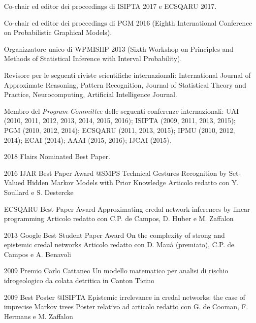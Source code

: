 \begin{cvitems}
\item Co-chair ed editor dei proceedings di ISIPTA 2017 e ECSQARU 2017.
\item Co-chair ed editor dei proceedings di PGM 2016 (Eighth International Conference on Probabilistic Graphical Models).
\item Organizzatore unico di WPMISIIP 2013 (Sixth Workshop on Principles and Methods of Statistical Inference with Interval Probability).
\item Revisore per le seguenti riviste scientifiche internazionali: International Journal of Approximate Reasoning, Pattern Recognition, Journal of Statistical Theory and Practice, Neurocomputing, Artificial Intelligence Journal.
\item Membro del \emph{Program Committee} delle seguenti conferenze internazionali: UAI (2010, 2011, 2012, 2013, 2014, 2015, 2016); ISIPTA (2009, 2011, 2013, 2015); PGM (2010, 2012, 2014); ECSQARU (2011, 2013, 2015); IPMU (2010, 2012, 2014); ECAI (2014); AAAI (2015, 2016); IJCAI (2015).
\item 2018 Flairs Nominated Best Paper.
\item 2016 IJAR Best Paper Award @SMPS Technical Gestures Recognition by Set-Valued Hidden Markov Models with Prior Knowledge Articolo redatto con Y. Soullard e S. Destercke
\item ECSQARU Best Paper Award Approximating credal network inferences by linear programming Articolo redatto con C.P. de Campos, D. Huber e M. Zaffalon
\item 2013 Google Best Student Paper Award On the complexity of strong and epistemic credal networks Articolo redatto con D. Mau\`a (premiato), C.P. de Campos e A. Benavoli
\item 2009 Premio Carlo Cattaneo Un modello matematico per analisi di rischio idrogeologico da colata detritica in Canton Ticino
\item 2009 Best Poster @ISIPTA Epistemic irrelevance in credal networks: the case of imprecise Markov trees Poster relativo ad articolo redatto con G. de Cooman, F. Hermans e M. Zaffalon
\end{cvitems}

